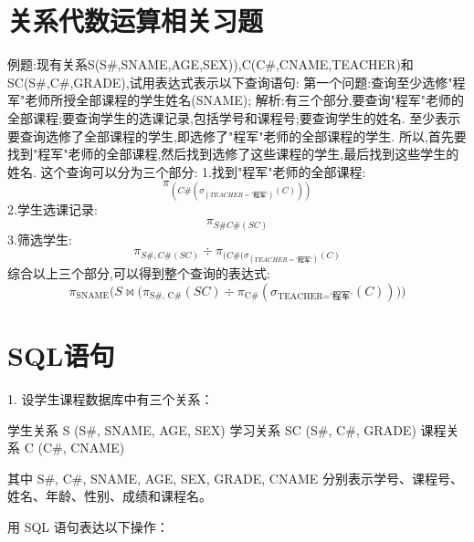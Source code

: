 \documentclass[12pt,a4paper]{article}
\begin{document}
\section{关系代数运算相关习题}
例题:现有关系S(S\#,SNAME,AGE,SEX)),C(C\#,CNAME,TEACHER)和SC(S\#,C\#,GRADE),试用表达式表示以下查询语句:
第一个问题:查询至少选修"程军"老师所授全部课程的学生姓名(SNAME);
解析:有三个部分,要查询"程军"老师的全部课程;要查询学生的选课记录,包括学号和课程号;要查询学生的姓名.
至少表示要查询选修了全部课程的学生,即选修了"程军"老师的全部课程的学生.
所以,首先要找到"程军"老师的全部课程,然后找到选修了这些课程的学生,最后找到这些学生的姓名.
这个查询可以分为三个部分:
1.找到"程军"老师的全部课程:\\
\begin{equation}
    \pi_{(C\#(\sigma_(TEACHER='\text{程军}')(C)))}
\end{equation}
2.学生选课记录:\\
\begin{equation}
    \pi_{S\# C\#(SC)}
\end{equation}
3.筛选学生:
\begin{equation}
    {\pi_{S\#,C\#(SC)}}\div{\pi_{(C\#(\sigma_(TEACHER='\text{程军}')(C)}}
\end{equation}
综合以上三个部分,可以得到整个查询的表达式:\\
\begin{equation}
    \pi_{\text{SNAME}} \Big( S \Join \big( \pi_{\text{S\#, C\#}}(SC) \div \pi_{\text{C\#}}( \sigma_{\text{TEACHER='程军'}}(C) ) \big) \Big)
\end{equation}
 
\section{SQL语句}
1. 设学生课程数据库中有三个关系：

   学生关系 S (S\#, SNAME, AGE, SEX)
    学习关系 SC (S\#, C\#, GRADE)
   课程关系 C (C\#, CNAME)

   其中 S\#, C\#, SNAME, AGE, SEX, GRADE, CNAME 分别表示学号、课程号、姓名、年龄、性别、成绩和课程名。

用 SQL 语句表达以下操作：
\end{document}

